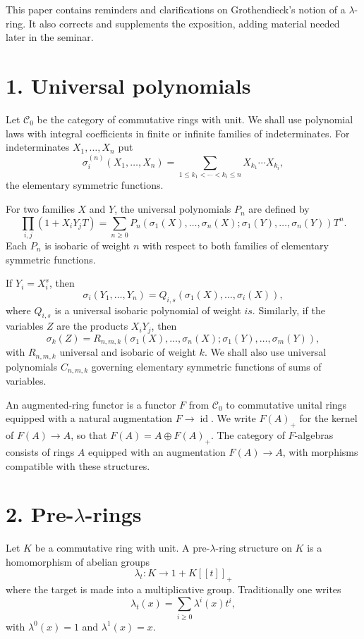 \documentclass[11pt]{article}
\theoremstyle{plain}
\theoremstyle{definition}
\theoremstyle{remark}
\begin{document}
This paper contains reminders and clarifications on Grothendieck's notion of a $\lambda$-ring. It also corrects and supplements the exposition, adding material needed later in the seminar.

\section*{1. Universal polynomials}
Let $\mathcal C_0$ be the category of commutative rings with unit. We shall use polynomial laws with integral coefficients in finite or infinite families of indeterminates. For indeterminates $X_1,\ldots,X_n$ put
\[
\sigma_i^{(n)}(X_1,\ldots,X_n)=
\sum_{1\le k_1<\cdots<k_i\le n}X_{k_1}\cdots X_{k_i},
\]
the elementary symmetric functions.

For two families $X$ and $Y$, the universal polynomials $P_n$ are defined by
\[
\prod_{i,j}(1+X_iY_jT)
=\sum_{n\ge0}P_n(\sigma_1(X),\ldots,\sigma_n(X);\sigma_1(Y),\ldots,\sigma_n(Y))T^n.
\]
Each $P_n$ is isobaric of weight $n$ with respect to both families of elementary symmetric functions.

If $Y_i=X_i^s$, then
\[
\sigma_i(Y_1,\ldots,Y_n)=Q_{i,s}(\sigma_1(X),\ldots,\sigma_i(X)),
\]
where $Q_{i,s}$ is a universal isobaric polynomial of weight $is$. Similarly, if the variables $Z$ are the products $X_iY_j$, then
\[
\sigma_k(Z)=R_{n,m,k}(\sigma_1(X),\ldots,\sigma_n(X);\sigma_1(Y),\ldots,\sigma_m(Y)),
\]
with $R_{n,m,k}$ universal and isobaric of weight $k$. We shall also use universal polynomials $C_{n,m,k}$ governing elementary symmetric functions of sums of variables.

An augmented-ring functor is a functor $F$ from $\mathcal C_0$ to commutative unital rings equipped with a natural augmentation $F\to\operatorname{id}$. We write $F(A)_+$ for the kernel of $F(A)\to A$, so that $F(A)=A\oplus F(A)_+$. The category of $F$-algebras consists of rings $A$ equipped with an augmentation $F(A)\to A$, with morphisms compatible with these structures.

\section*{2. Pre-$\lambda$-rings}
Let $K$ be a commutative ring with unit. A pre-$\lambda$-ring structure on $K$ is a homomorphism of abelian groups
\[
\lambda_t:K\longrightarrow 1+K[[t]]_+
\]
where the target is made into a multiplicative group. Traditionally one writes
\[
\lambda_t(x)=\sum_{i\ge0}\lambda^i(x)t^i,
\]
with $\lambda^0(x)=1$ and $\lambda^1(x)=x$.
\end{document}
